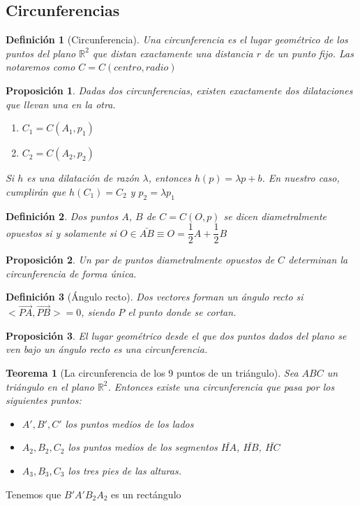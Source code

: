 \documentclass[11pt, a4paper, titlepage]{article}
\makeatletter
\renewenvironment{proof}[1][\proofname] {\vspace{-15pt}\par\pushQED{\qed}\normalfont\topsep6\p@\@plus6\p@\relax\trivlist\item[\hskip\labelsep\it#1\@addpunct{.}]\ignorespaces}{\popQED\endtrivlist\@endpefalse}
\newcommand{\R}{\mathbb{R}}
\theoremstyle{theorem-style}
\newtheorem*{nth}{Teorema}
\newtheorem*{nprop}{Proposición}
\theoremstyle{definition-style}
\newtheorem*{ndef}{Definición}
\theoremstyle{remark-style}
\theoremstyle{example-style}
\makeatother
\begin{document}
\subsection{Circunferencias}

\begin{ndef}[Circunferencia]
	Una circunferencia es el lugar geométrico de los puntos del plano $\R^2$ que distan exactamente una distancia $r$ de un punto fijo. Las notaremos como $C = C(centro,radio)$
\end{ndef}

\begin{nprop}
	Dadas dos circunferencias, existen exactamente dos dilataciones que llevan una en la otra.
	\begin{enumerate}
	\item $C_1 = C(A_1,p_1)$
	\item $C_2 = C(A_2,p_2)$
\end{enumerate}
Si $h$ es una dilatación de razón $\lambda$, entonces $h(p) = \lambda p + b$.
En nuestro caso, cumplirán que $h(C_1) = C_2$ y $p_2 = \lambda p_1$
\end{nprop}



\begin{ndef}
	Dos puntos $A$, $B$ de $C = C(O,p) $ se dicen diametralmente opuestos si y solamente si $O \in \bar{AB} \equiv O = \dfrac{1}{2}A + \dfrac{1}{2}B$
\end{ndef}


\begin{nprop}
	Un par de puntos diametralmente opuestos de $C$ determinan la circunferencia de forma única.
\end{nprop}

\begin{ndef}[Ángulo recto]
	Dos vectores forman un ángulo recto si $<\vec{PA},\vec{PB}> = 0$, siendo $P$ el punto donde se cortan.
\end{ndef}

\begin{nprop}
	El lugar geométrico desde el que dos puntos dados del plano se ven bajo un ángulo recto es una circunferencia.
\end{nprop}

\begin{nth}[La circunferencia de los 9 puntos de un triángulo]
	Sea $ABC$ un triángulo en el plano $\R^2$. Entonces existe una circunferencia que pasa por los siguientes puntos:
	\begin{itemize}
	\item $A',B',C'$ los puntos medios de los lados
	\item $A_2,B_2,C_2$ los puntos medios de los segmentos $\bar{HA}$, $\bar{HB}$, $\bar{HC}$
	\item $A_3,B_3,C_3$ los tres pies de las alturas.
\end{itemize}
\end{nth}
\begin{proof}
	Tenemos que $B'A'B_2A_2$ es un rectángulo
\end{proof}
\end{document}
